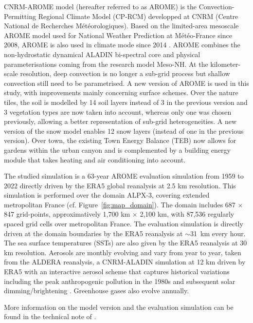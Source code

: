 \documentclass[hess, manuscript]{copernicus}
\begin{document}
CNRM-AROME model (hereafter referred to as AROME) is the Convection-Permitting Regional Climate Model (CP-RCM) developped at CNRM (Centre National de Recherches Météorologiques). Based on the limited-area mesoscale AROME model \citep{seity-etal-2011} used for National Weather Prediction at Météo-France since 2008, AROME is also used in climate mode since 2014 \citep{Caillaud2021,lucaspicher-etal-2024}.
AROME combines the non-hydrostatic dynamical ALADIN bi-spectral core and physical parameterisations coming from the research model Meso-NH. At the kilometer-scale resolution, deep convection is no longer a sub-grid process but shallow convection still need to be parametrised. A new version of AROME is used in this study, with improvements mainly concerning surface schemes. Over the nature tiles, the soil is modelled by 14 soil layers instead of 3 in the previous version and 3 vegetation types are now taken into account, whereas only one was chosen previously, allowing a better representation of sub-grid heterogeneities. A new version of the snow model enables 12 snow layers (instead of one in the previous version). Over town, the existing Town Energy Balance (TEB) \citep{masson-2000} now allows for gardens within the urban canyon and is complemented by a building energy module that takes heating and air conditioning into account.

The studied simulation is a 63-year AROME evaluation simulation from 1959 to 2022 directly driven by the ERA5 global reanalysis \citep{hersbach2020era5} at 2.5 km resolution. This simulation is performed over the domain ALPX-3, covering extended metropolitan France (cf. Figure~\ref{fig:map_domain}). The domain includes 687 $\times$ 847 grid-points, approximatively 1,700 km $\times$ 2,100 km, with 87,536 regularly spaced grid cells over metropolitan France. The evaluation simulation is directly driven at the domain boundaries by the ERA5 reanalysis at \(\sim\)31~km every hour. The sea surface temperatures (SSTs) are also given by the ERA5 reanalysis at 30 km resolution. Aerosols are monthly evolving and vary from year to year, taken from the ALDERA reanalysis, a CNRM-ALADIN simulation at 12 km driven by ERA5 with an interactive aerosol scheme that captures historical variations including the peak anthropogenic pollution in the 1980s and subsequent solar dimming/brightening \citep{nabat-etal-2020}. Greenhouse gases also evolve annually.

More information on the model version and the evaluation simulation can be found 
in the technical note of \cite{caillaud-etal-2026}.
\end{document}
